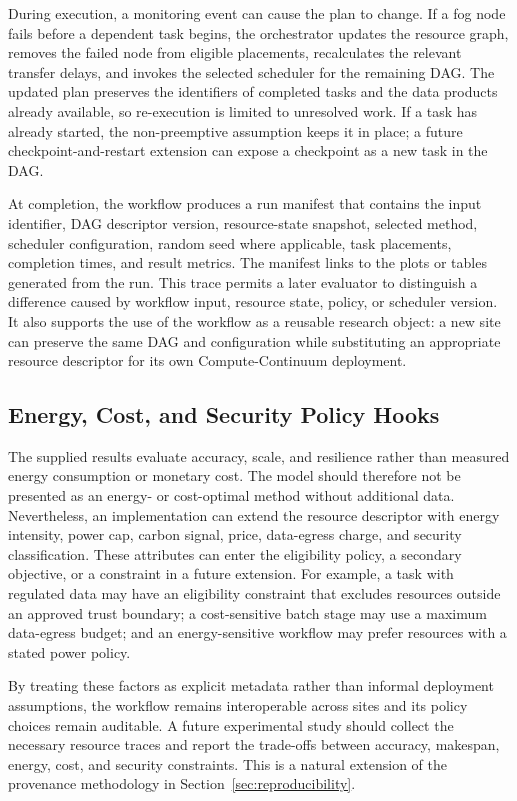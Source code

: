 During execution, a monitoring event can cause the plan to change. If a fog node fails before a dependent task begins, the orchestrator updates the resource graph, removes the failed node from eligible placements, recalculates the relevant transfer delays, and invokes the selected scheduler for the remaining DAG. The updated plan preserves the identifiers of completed tasks and the data products already available, so re-execution is limited to unresolved work. If a task has already started, the non-preemptive assumption keeps it in place; a future checkpoint-and-restart extension can expose a checkpoint as a new task in the DAG.

At completion, the workflow produces a run manifest that contains the input identifier, DAG descriptor version, resource-state snapshot, selected method, scheduler configuration, random seed where applicable, task placements, completion times, and result metrics. The manifest links to the plots or tables generated from the run. This trace permits a later evaluator to distinguish a difference caused by workflow input, resource state, policy, or scheduler version. It also supports the use of the workflow as a reusable research object: a new site can preserve the same DAG and configuration while substituting an appropriate resource descriptor for its own Compute-Continuum deployment.

\subsection{Energy, Cost, and Security Policy Hooks}

The supplied results evaluate accuracy, scale, and resilience rather than measured energy consumption or monetary cost. The model should therefore not be presented as an energy- or cost-optimal method without additional data. Nevertheless, an implementation can extend the resource descriptor with energy intensity, power cap, carbon signal, price, data-egress charge, and security classification. These attributes can enter the eligibility policy, a secondary objective, or a constraint in a future extension. For example, a task with regulated data may have an eligibility constraint that excludes resources outside an approved trust boundary; a cost-sensitive batch stage may use a maximum data-egress budget; and an energy-sensitive workflow may prefer resources with a stated power policy.

By treating these factors as explicit metadata rather than informal deployment assumptions, the workflow remains interoperable across sites and its policy choices remain auditable. A future experimental study should collect the necessary resource traces and report the trade-offs between accuracy, makespan, energy, cost, and security constraints. This is a natural extension of the provenance methodology in Section~\ref{sec:reproducibility}.
